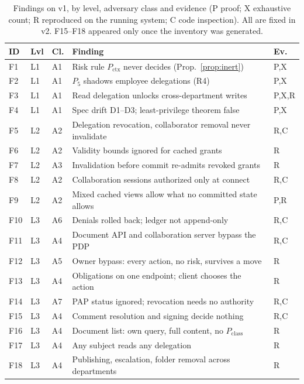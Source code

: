 \documentclass[sigconf,review,anonymous]{acmart}
\newcommand{\Pc}{P_{\mathrm{class}}}
\newcommand{\Px}{P_{\mathrm{ctx}}}
\begin{document}
\begin{table}[t]
\caption{Findings on v1, by level, adversary class and evidence (P proof; X exhaustive count; R reproduced on the
running system; C code inspection). All are fixed in v2. F15--F18 appeared only once the inventory was generated.}
\label{tab:findings}
\small
\begin{tabularx}{\columnwidth}{@{}l@{\;}l@{\;}l@{\;}X@{\;}l@{}}
\toprule
ID & Lvl & Cl. & Finding & Ev. \\
\midrule
F1 & L1 & A1 & Risk rule $\Px$ never decides (Prop.~\ref{prop:inert}) & P,X \\
F2 & L1 & A1 & $P_5$ shadows employee delegations (R4) & P,X \\
F3 & L1 & A1 & Read delegation unlocks cross-department writes & P,X,R \\
F4 & L1 & A1 & Spec drift D1--D3; least-privilege theorem false & P,X \\
F5 & L2 & A2 & Delegation revocation, collaborator removal never invalidate & R,C \\
F6 & L2 & A2 & Validity bounds ignored for cached grants & R \\
F7 & L2 & A3 & Invalidation before commit re-admits revoked grants & R \\
F8 & L2 & A2 & Collaboration sessions authorized only at connect & R,C \\
F9 & L2 & A2 & Mixed cached views allow what no committed state allows & P,R \\
F10 & L3 & A6 & Denials rolled back; ledger not append-only & R,C \\
F11 & L3 & A4 & Document API and collaboration server bypass the PDP & R,C \\
F12 & L3 & A5 & Owner bypass: every action, no risk, survives a move & R \\
F13 & L3 & A4 & Obligations on one endpoint; client chooses the action & R \\
F14 & L3 & A7 & PAP status ignored; revocation needs no authority & R,C \\
F15 & L3 & A4 & Comment resolution and signing decide nothing & R,C \\
F16 & L3 & A4 & Document list: own query, full content, no $\Pc$ & R \\
F17 & L3 & A4 & Any subject reads any delegation & R \\
F18 & L3 & A4 & Publishing, escalation, folder removal across departments & R \\
\bottomrule
\end{tabularx}
\end{table}
\end{document}
